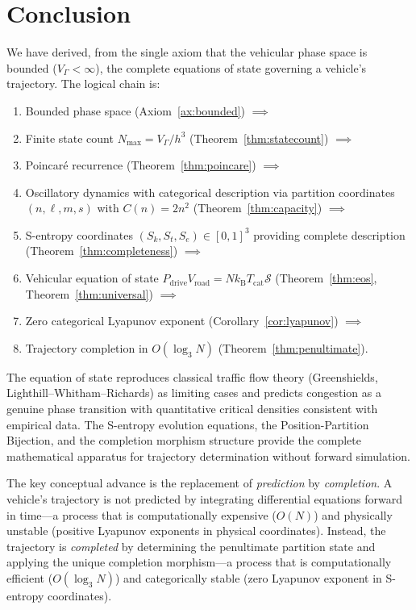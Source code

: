 \documentclass[twocolumn,10pt]{article}
\newcommand{\kB}{k_{\mathrm{B}}}
\newcommand{\Tcat}{T_{\mathrm{cat}}}
\newcommand{\Pdrive}{P_{\mathrm{drive}}}
\newcommand{\Vroad}{V_{\mathrm{road}}}
\newcommand{\VGamma}{V_{\Gamma}}
\newcommand{\Nmax}{N_{\mathrm{max}}}
\newcommand{\Sk}{S_k}
\newcommand{\St}{S_t}
\newcommand{\Se}{S_e}
\begin{document}
\section{Conclusion}\label{sec:conclusion}

We have derived, from the single axiom that the vehicular phase space is bounded ($\VGamma < \infty$), the complete equations of state governing a vehicle's trajectory. The logical chain is:

\begin{enumerate}
    \item Bounded phase space (Axiom~\ref{ax:bounded}) $\implies$
    \item Finite state count $\Nmax = \VGamma / h^3$ (Theorem~\ref{thm:statecount}) $\implies$
    \item Poincar\'{e} recurrence (Theorem~\ref{thm:poincare}) $\implies$
    \item Oscillatory dynamics with categorical description via partition coordinates $(n, \ell, m, s)$ with $C(n) = 2n^2$ (Theorem~\ref{thm:capacity}) $\implies$
    \item S-entropy coordinates $(\Sk, \St, \Se) \in [0,1]^3$ providing complete description (Theorem~\ref{thm:completeness}) $\implies$
    \item Vehicular equation of state $\Pdrive \Vroad = N\kB\Tcat\mathcal{S}$ (Theorem~\ref{thm:eos}, Theorem~\ref{thm:universal}) $\implies$
    \item Zero categorical Lyapunov exponent (Corollary~\ref{cor:lyapunov}) $\implies$
    \item Trajectory completion in $O(\log_3 N)$ (Theorem~\ref{thm:penultimate}).
\end{enumerate}

The equation of state reproduces classical traffic flow theory (Greenshields, Lighthill--Whitham--Richards) as limiting cases and predicts congestion as a genuine phase transition with quantitative critical densities consistent with empirical data. The S-entropy evolution equations, the Position-Partition Bijection, and the completion morphism structure provide the complete mathematical apparatus for trajectory determination without forward simulation.

The key conceptual advance is the replacement of \emph{prediction} by \emph{completion}. A vehicle's trajectory is not predicted by integrating differential equations forward in time---a process that is computationally expensive ($O(N)$) and physically unstable (positive Lyapunov exponents in physical coordinates). Instead, the trajectory is \emph{completed} by determining the penultimate partition state and applying the unique completion morphism---a process that is computationally efficient ($O(\log_3 N)$) and categorically stable (zero Lyapunov exponent in S-entropy coordinates).
\end{document}
